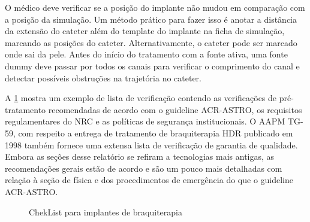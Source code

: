 \documentclass[11pt,a4paper]{article}
\newcounter{exemplo}
\begin{document}
	O médico deve verificar se a posição do implante não mudou em comparação com a posição da simulação. Um método prático para fazer isso é anotar a distância da extensão do cateter além do template do implante na ficha de simulação, marcando as posições do cateter. Alternativamente, o cateter pode ser marcado onde sai da pele. Antes do início do tratamento com a fonte ativa, uma fonte dummy deve passar por todos os canais para verificar o comprimento do canal e detectar possíveis obstruções na trajetória no cateter. 
	
	A \ref{fig:checklist} mostra um exemplo de lista de verificação contendo as verificações de pré-tratamento recomendadas de acordo com o guideline ACR-ASTRO, os requisitos regulamentares do NRC e as políticas de segurança institucionais. O AAPM TG-59, com respeito a entrega de tratamento de braquiterapia HDR publicado em 1998 também fornece uma extensa lista de verificação de garantia de qualidade. Embora as seções desse relatório se refiram a tecnologias mais antigas, as recomendações gerais estão de acordo e são um pouco mais detalhadas com relação à seção de física e dos procedimentos de emergência do que o guideline ACR-ASTRO.

	\begin{figure}[h]
		\centering
		\caption{ChekList para implantes de braquiterapia}
		\label{fig:checklist}
	\end{figure}




\end{document}
